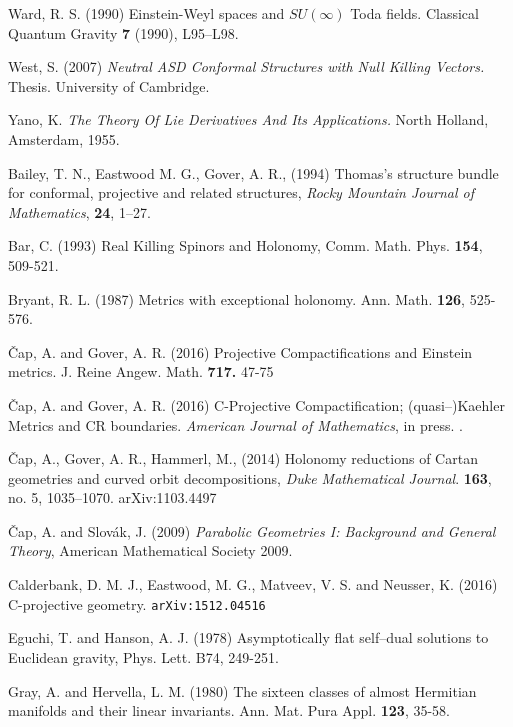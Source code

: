 \begin{thebibliography}{}
 Ward, R. S. (1990) Einstein-Weyl spaces and 
$SU(\infty)$ Toda fields. Classical Quantum Gravity {\bf 7} (1990), L95–L98.


 West, S. (2007) {\em Neutral ASD Conformal Structures with Null Killing Vectors.} Thesis. University of Cambridge.

 Yano, K. {\em The Theory Of Lie Derivatives And Its Applications.} North Holland, Amsterdam, 1955.




 Bailey, T. N., Eastwood M. G., Gover, A. R., (1994)
Thomas's structure bundle for conformal, projective
  and related structures, {\em Rocky Mountain Journal of
    Mathematics}, {\bf 24}, 1--27.
  
 Bar, C. (1993) 
Real Killing Spinors and Holonomy,
Comm. Math. Phys. {\bf 154}, 509-521.

 Bryant, R. L. (1987)
Metrics with exceptional holonomy. Ann. Math. {\bf 126}, 525-576.


 \v Cap, A. and Gover, A. R. (2016)
Projective Compactifications and Einstein metrics.
J. Reine Angew. Math. {\bf 717.}  47-75

 \v Cap, A. and Gover, A. R. (2016)
C-Projective Compactification; (quasi--)Kaehler Metrics and CR boundaries.
{\em  American Journal of Mathematics}, in press. .

 \v Cap, A., Gover, A. R., Hammerl, M., (2014) 
  Holonomy reductions of Cartan geometries and curved orbit
  decompositions, {\em Duke Mathematical Journal}. 
{\bf 163}, no. 5, 1035--1070.
 \quad arXiv:1103.4497

  
\v{C}ap, A. and Slov\'ak, J. (2009)
\emph{Parabolic Geometries I: Background and General Theory},
American Mathematical Society 2009.


 Calderbank,  D. M. J.,  Eastwood, M. G.,  Matveev, V. S. and 
Neusser, K.  (2016) C-projective geometry. {\tt arXiv:1512.04516}






Eguchi, T. and Hanson, A. J. (1978) Asymptotically flat self--dual solutions
to Euclidean gravity, Phys. Lett. B74, 249-251.

Gray, A. and Hervella, L. M. (1980) The sixteen classes of almost Hermitian manifolds and their linear
invariants. Ann. Mat. Pura Appl. {\bf 123}, 35-58.


\end{thebibliography}
